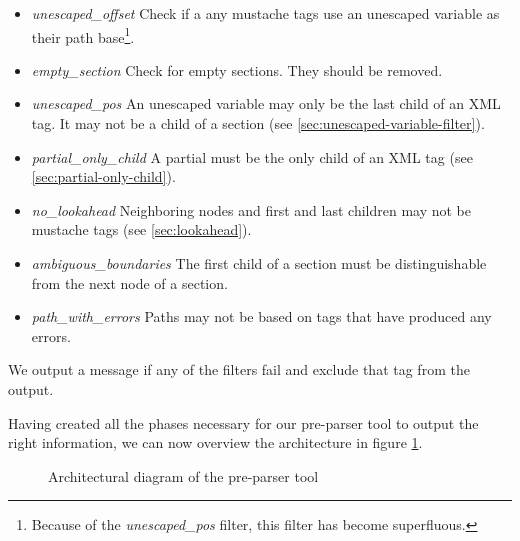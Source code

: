 \documentclass[thesis.tex]{subfiles}
\begin{document}
\begin{itemize}
\item \emph{unescaped\_offset} Check if a any mustache tags use an unescaped
                               variable as their path base\footnote{
                               	Because of the \emph{unescaped\_pos} filter,
                               	this filter has become superfluous.
                               }.
\item \emph{empty\_section} Check for empty sections. They should be removed.
\item \emph{unescaped\_pos} An unescaped variable may only be the last child
                            of an XML tag. It may not be a child of a section
                            (see \ref{sec:unescaped-variable-filter}).
\item \emph{partial\_only\_child} A partial must be the only child of an XML tag
                                  (see \ref{sec:partial-only-child}).
\item \emph{no\_lookahead} Neighboring nodes and first and last children may not
                           be mustache tags (see \ref{sec:lookahead}).
\item \emph{ambiguous\_boundaries} The first child of a section must be
                                   distinguishable from the next node of a
                                   section.
\item \emph{path\_with\_errors} Paths may not be based on tags that have
                                produced any errors.
\end{itemize}

We output a message if any of the filters fail and exclude that tag from the
output.

Having created all the phases necessary for our pre-parser tool to output the
right information, we can now overview the architecture in figure \ref{fig:tool-arch}.

\begin{figure}
	\centering
	\resizebox{\linewidth}{!}{}
	\caption{Architectural diagram of the pre-parser tool}
	\label{fig:tool-arch}
\end{figure}
\end{document}
